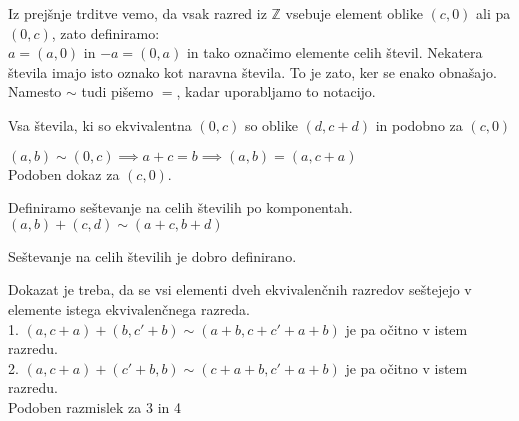 \begin{definicija}
    Iz prejšnje trditve vemo, da vsak razred iz $\mathbb{Z}$ vsebuje element oblike $(c, 0)$ ali pa $(0, c)$, zato definiramo: \\
    $a = (a, 0)$ in $-a = (0, a)$ in tako označimo elemente celih števil.
    Nekatera števila imajo isto oznako kot naravna števila.
    To je zato, ker se enako obnašajo.
    Namesto $\sim$ tudi pišemo $=$, kadar uporabljamo to notacijo.
\end{definicija}

\begin{trditev}
    Vsa števila, ki so ekvivalentna $(0, c)$ so oblike $(d, c + d)$ in podobno za $(c, 0)$
\end{trditev}
\begin{dokaz}
    $(a, b) \sim (0, c) \implies a + c = b \implies (a, b) = (a, c + a)$ \\
    Podoben dokaz za $(c, 0)$.
\end{dokaz}

\begin{definicija}
    Definiramo seštevanje na celih številih po komponentah.
    $(a, b) + (c, d) \sim (a + c, b + d)$
\end{definicija}

\begin{trditev}
    Seštevanje na celih številih je dobro definirano.
\end{trditev}
\begin{dokaz}
    Dokazat je treba, da se vsi elementi dveh ekvivalenčnih razredov seštejejo v elemente istega ekvivalenčnega razreda. \\
    1. $(a, c + a) + (b, c' + b) \sim (a + b, c + c' + a + b)$ je pa očitno v istem razredu. \\
    2. $(a, c + a) + (c' + b, b) \sim (c + a + b, c' + a + b)$ je pa očitno v istem razredu. \\
    Podoben razmislek za 3 in 4
\end{dokaz}

